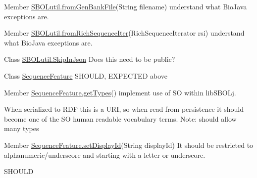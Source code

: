 \label{todo__todo000005}
\hypertarget{todo__todo000005}{}
 
\begin{DoxyDescription}
\item[Member \hyperlink{classorg_1_1sbolstandard_1_1lib_s_b_o_lj_1_1_s_b_o_lutil_ab30e7fc9ccb218e864e45cad4366304a}{SBOLutil.fromGenBankFile}(String filename) ]understand what BioJava exceptions are. 
\end{DoxyDescription}

\label{todo__todo000006}
\hypertarget{todo__todo000006}{}
 
\begin{DoxyDescription}
\item[Member \hyperlink{classorg_1_1sbolstandard_1_1lib_s_b_o_lj_1_1_s_b_o_lutil_a375e674a9edc77307e250df41d76f02d}{SBOLutil.fromRichSequenceIter}(RichSequenceIterator rsi) ]understand what BioJava exceptions are. 
\end{DoxyDescription}

\label{todo__todo000007}
\hypertarget{todo__todo000007}{}
 
\begin{DoxyDescription}
\item[Class \hyperlink{interfaceorg_1_1sbolstandard_1_1lib_s_b_o_lj_1_1_s_b_o_lutil_1_1_skip_in_json}{SBOLutil.SkipInJson} ]Does this need to be public?
\end{DoxyDescription}

\label{todo__todo000008}
\hypertarget{todo__todo000008}{}
 
\begin{DoxyDescription}
\item[Class \hyperlink{classorg_1_1sbolstandard_1_1lib_s_b_o_lj_1_1_sequence_feature}{SequenceFeature} ]SHOULD, EXPECTED above
\end{DoxyDescription}

\label{todo__todo000010}
\hypertarget{todo__todo000010}{}
 
\begin{DoxyDescription}
\item[Member \hyperlink{classorg_1_1sbolstandard_1_1lib_s_b_o_lj_1_1_sequence_feature_a518b97368db3de477d5fb57150d8b711}{SequenceFeature.getTypes}() ]implement use of SO within libSBOLj. 

When serialized to RDF this is a URI, so when read from persistence it should become one of the SO human readable vocabulary terms. Note: should allow many types 
\end{DoxyDescription}

\label{todo__todo000009}
\hypertarget{todo__todo000009}{}
 
\begin{DoxyDescription}
\item[Member \hyperlink{classorg_1_1sbolstandard_1_1lib_s_b_o_lj_1_1_sequence_feature_a46b93a70e7bd612a7b429aac4829bc88}{SequenceFeature.setDisplayId}(String displayId) ]It should be restricted to alphanumeric/underscore and starting with a letter or underscore. 

SHOULD 
\end{DoxyDescription}
